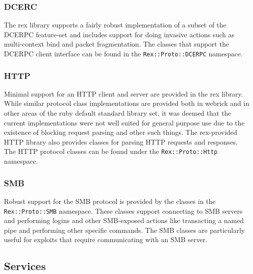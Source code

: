 \documentclass{report}
\begin{document}
            \subsubsection{DCERC}

\par
The rex library supports a fairly robust implementation of a subset
of the DCERPC feature-set and includes support for doing invasive
actions such as multi-context bind and packet fragmentation.  The
classes that support the DCERPC client interface can be found in the
\texttt{Rex::Proto::DCERPC} namespace.

            \subsubsection{HTTP}

\par
Minimal support for an HTTP client and server are provided in the
rex library.  While similar protocol class implementations are
provided both in webrick and in other areas of the ruby default
standard library set, it was deemed that the current implementations
were not well suited for general purpose use due to the existence of
blocking request parsing and other such things.  The rex-provided
HTTP library also provides classes for parsing HTTP requests and
responses.  The HTTP protocol classes can be found under the
\texttt{Rex::Proto::Http} namespace.

            \subsubsection{SMB}

\par
Robust support for the SMB protocol is provided by the classes in
the \texttt{Rex::Proto::SMB} namespace.  These classes support
connecting to SMB servers and performing logins and other
SMB-exposed actions like transacting a named pipe and performing
other specific commands.  The SMB classes are particularly useful
for exploits that require communicating with an SMB server.

        \subsection{Services}
\end{document}

